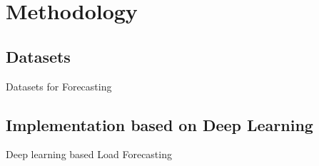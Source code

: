 \section{Methodology}

\subsection{Datasets}
\begin{frame}[allowframebreaks]{Datasets for Forecasting}


\end{frame}


\subsection{Implementation based on Deep Learning}
\begin{frame}[allowframebreaks]{Deep learning based Load Forecasting }

\end{frame}
